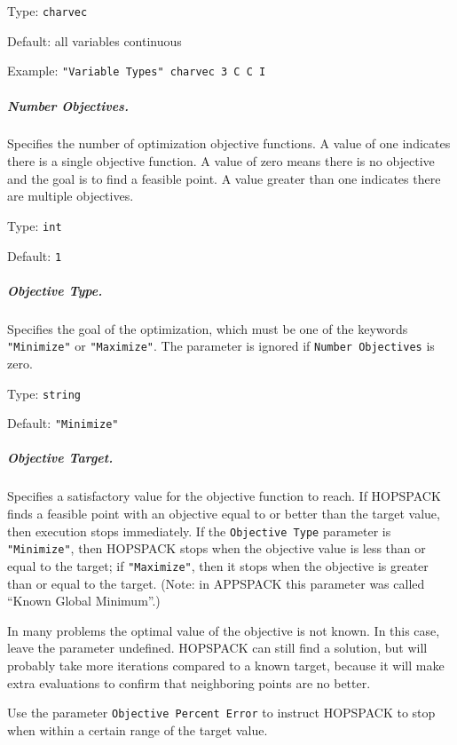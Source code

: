 \hspace{0.2in}
Type: {\tt charvec}

\hspace{0.2in}
Default: all variables continuous

\hspace{0.2in}
Example: {\tt "Variable Types" charvec 3  C C I}

\subparagraph{Number Objectives.}  \label{param:PD-numobjs}
Specifies the number of optimization objective functions.
A value of one indicates there is a single objective function.
A value of zero means there is no objective and the goal is to find a
feasible point.
A value greater than one indicates there are multiple objectives.

\hspace{0.2in}
Type: {\tt int}

\hspace{0.2in}
Default: {\tt 1}

\subparagraph{Objective Type.}  \label{param:PD-objtype}
Specifies the goal of the optimization, which must be one of the keywords
{\tt "Minimize"} or {\tt "Maximize"}.
The parameter is ignored if {\tt Number Objectives} is zero.

\hspace{0.2in}
Type: {\tt string}

\hspace{0.2in}
Default: {\tt "Minimize"}

\subparagraph{Objective Target.}  \label{param:PD-objtgt}
Specifies a satisfactory value for the objective function to reach.
If HOPSPACK finds a feasible point with an objective equal to or better than
the target value, then execution stops immediately.
If the {\tt Objective Type} parameter is {\tt "Minimize"},
then HOPSPACK stops when the objective value is less than or
equal to the target; if {\tt "Maximize"},
then it stops when the objective is greater than or equal to the target.
(Note:  in APPSPACK this parameter was called ``Known Global Minimum''.)

\noindent
In many problems the optimal value of the objective is not known.  In this case,
leave the parameter undefined.  HOPSPACK can still find a solution, but will
probably take more iterations compared to a known target, because it will
make extra evaluations to confirm that neighboring points are no better.

\noindent
Use the parameter {\tt Objective Percent Error} to instruct HOPSPACK to stop
when within a certain range of the target value.

